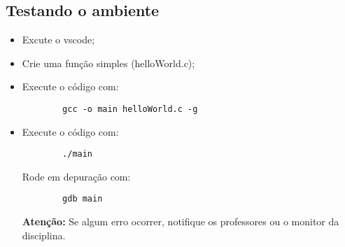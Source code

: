 \documentclass[12pt]{article}
\begin{document}
\subsection*{Testando o ambiente}
\begin{itemize}
    \item Excute o vscode;
    \item Crie uma função simples (helloWorld.c);
    \item Execute o código com:
    \begin{verbatim}
        gcc -o main helloWorld.c -g
    \end{verbatim}
    \item Execute o código com:
    \begin{verbatim}
        ./main
    \end{verbatim}
    Rode em depuração com:
    \begin{verbatim}
        gdb main
    \end{verbatim}
    \textbf{Atenção:}  Se algum erro ocorrer, notifique os professores ou o monitor da disciplina.
\end{itemize}
\end{document}
